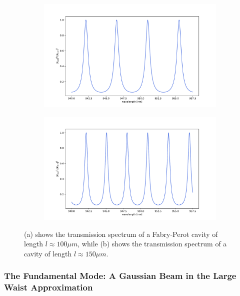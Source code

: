 \begin{figure}[h!]
    \centering
    \begin{subfigure}[b]{0.49\textwidth}
        \includegraphics[width=\textwidth]{figures/100um_broadband_trans.pdf}
        \caption{}
    \end{subfigure}
    \begin{subfigure}[b]{0.49\textwidth}
        \includegraphics[width=\textwidth]{figures/150um_broadband_trans.pdf}
        \caption{}
    \end{subfigure}
    \caption{(a) shows the transmission spectrum of a Fabry-Perot cavity of length $l \approx 100 \mu m$, while (b) shows the transmission spectrum of a cavity of length $l \approx 150 \mu m$.}
    \label{fig:fabry_perot_FSR_comparison}
\end{figure}


\subsubsection{The Fundamental Mode: A Gaussian Beam in the Large Waist Approximation}\label{sec:fundamental_mode}


